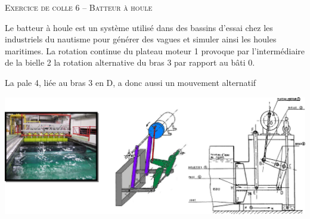 \documentclass[11pt,oneside]{article}
\begin{document}
\pagestyle{fancy}
\renewcommand{\headrulewidth}{0pt}

\fancyhead{}

\fancyhead[C]{\rule{12cm}{.5pt}}


\renewcommand{\footrulewidth}{0.2pt}

\fancyfoot[C]{\footnotesize{\bfseries \thepage}}


\begin{center}
 \LARGE\textsc{Exercice de colle 6 -- Batteur à houle}
\end{center}


\setlength{\parskip}{0ex plus 0.2ex minus 0ex}
 \renewcommand{\contentsname}{}
 \renewcommand{\baselinestretch}{1}

 \renewcommand{\baselinestretch}{1.2}
\setlength{\parskip}{2ex plus 0.5ex minus 0.2ex}
Le batteur à houle est un système utilisé dans des bassins d’essai chez les industriels du nautisme pour 
générer des vagues et simuler ainsi les houles maritimes.
La rotation continue du plateau moteur 1 provoque par l'intermédiaire de la bielle 2 la rotation alternative du 
bras 3 par rapport au bâti 0.

La pale 4, liée au bras 3 en D, a donc aussi un mouvement alternatif

\begin{center}
\includegraphics[width=.8\textwidth]{png/fig1}
\end{center}
\begin{minipage}[c]{.45\linewidth}
\end{minipage}\hfill
\begin{minipage}[c]{.45\linewidth}
\end{minipage}
\end{document}
